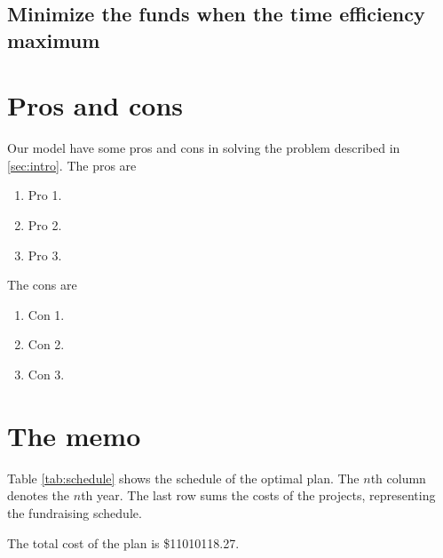 \documentclass{article}
\begin{document}
\subsection{Minimize the funds when the time efficiency maximum}


\section{Pros and cons}
Our model have some pros and cons in solving the problem described in \ref{sec:intro}.
The pros are
\begin{enumerate}
\item Pro 1.
\item Pro 2.
\item Pro 3.
\end{enumerate}

The cons are
\begin{enumerate}
\item Con 1.
\item Con 2.
\item Con 3.
\end{enumerate}


\newpage

\section{The memo}
\label{sec:memo}

Table \ref{tab:schedule} shows the schedule of the optimal plan.
The $n$th column denotes the $n$th year.
The last row sums the costs of the projects, representing the fundraising schedule.

The total cost of the plan is \$11010118.27.
\end{document}
